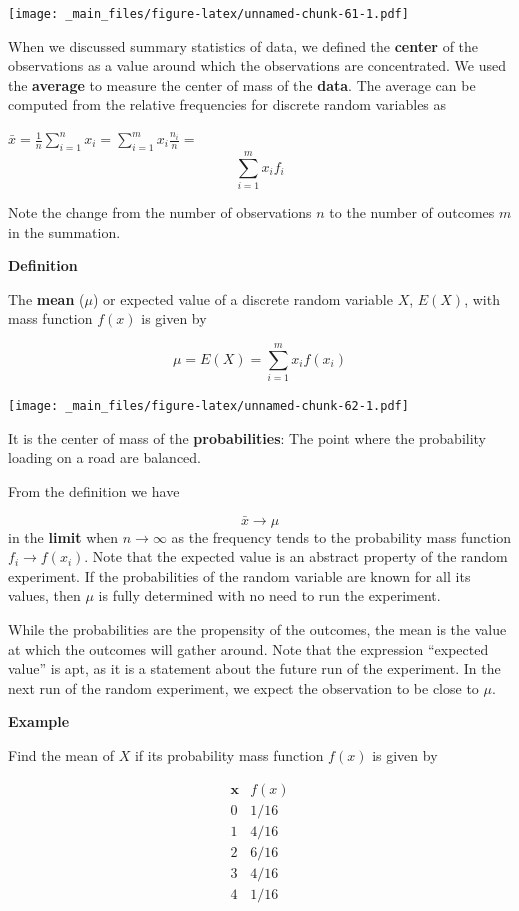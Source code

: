 \documentclass[
]{book}
\begin{document}
\texttt{[image: \_main\_files/figure-latex/unnamed-chunk-61-1.pdf]}

When we discussed summary statistics of data, we defined the \textbf{center} of the observations as a value around which the observations are concentrated. We used the \textbf{average} to measure the center of mass of the \textbf{data}. The average can be computed from the relative frequencies for discrete random variables as

\(\bar{x}= \frac{1}{n} \sum_{i=1}^n x_i = \sum_{i=1}^m x_i \frac{n_i}{n}=\) \[\sum_{i=1}^m x_i f_i\]

Note the change from the number of observations \(n\) to the number of outcomes \(m\) in the summation.

\textbf{Definition}

The \textbf{mean} (\(\mu\)) or expected value of a discrete random variable \(X\), \(E(X)\), with mass function \(f(x)\) is given by

\[ \mu = E(X)= \sum_{i=1}^m x_i f(x_i) \]

\texttt{[image: \_main\_files/figure-latex/unnamed-chunk-62-1.pdf]}

It is the center of mass of the \textbf{probabilities}: The point where the probability loading on a road are balanced.

From the definition we have

\[\bar{x} \rightarrow \mu\] in the \textbf{limit} when
\(n \rightarrow \infty\) as the frequency tends to the probability mass function \(f_i \rightarrow f(x_i)\). Note that the expected value is an abstract property of the random experiment. If the probabilities of the random variable are known for all its values, then \(\mu\) is fully determined with no need to run the experiment.

While the probabilities are the propensity of the outcomes, the mean is the value at which the outcomes will gather around. Note that the expression ``expected value'' is apt, as it is a statement about the future run of the experiment. In the next run of the random experiment, we expect the observation to be close to \(\mu\).

\textbf{Example}

Find the mean of \(X\) if its probability mass function \(f(x)\) is given by

\[
\begin{array}{cc}
\mathbf{x} & f(x) \\
0 & 1/16 \\
1 & 4/16 \\
2 & 6/16 \\
3 & 4/16 \\
4 & 1/16 \\
\end{array}
\]
\end{document}
